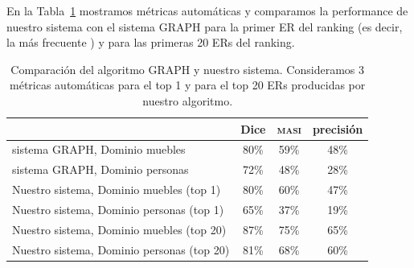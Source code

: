En la Tabla~\ref{Tabla_sis_1_20} mostramos m\'etricas autom\'aticas y comparamos la performance de nuestro sistema con el sistema GRAPH para la primer ER del ranking (es decir, la m\'as frecuente ) y para las primeras 20 ERs del ranking.
\vspace*{.09cm}
\begin{table}[h]
\begin{center}
\begin{tabular}{|l|c|c|c|}
\hline
	 	& 	Dice		&	\textsc{masi}	&	precisi\'on		\\
\hline
sistema GRAPH, Dominio muebles	& 	80\% 		&	59\%	&	48\%		 	\\
sistema GRAPH, Dominio personas 	& 	72\%		&	48\%	&	28\%			\\
\hline
Nuestro sistema, Dominio muebles (top 1)	&	80\%		&	60\%	&	47\%		\\
Nuestro sistema, Dominio personas (top 1)	&	65\%		&	37\%	&	19\%		\\
\hline
Nuestro sistema, Dominio muebles (top 20)&	87\%		&	75\%  	&	65\%		\\
Nuestro sistema, Dominio personas (top 20)   &	81\%		&68\%	&	60\%		\\
\hline
\end{tabular}
\caption{Comparaci\'on del algoritmo GRAPH y nuestro sistema. Consideramos 3 m\'etricas autom\'aticas para el top 1 y para el top 20 ERs producidas por nuestro algoritmo.}
\label{Tabla_sis_1_20}
\end{center}
\end{table}


